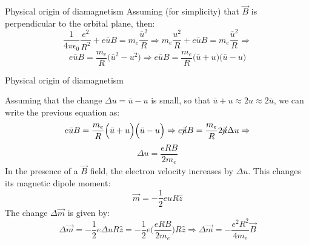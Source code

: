 \begin{frame}{Physical origin of diamagnetism}
Assuming (for simplicity) that $\vec{B}$ is perpendicular to the orbital plane, then:
\begin{equation*}
   \frac{1}{4\pi \epsilon_0} \frac{e^2}{R^2} + e \bar{u} B = m_e \frac{\bar{u}^2}{R} \Rightarrow
   m_e \frac{u^2}{R} + e \bar{u} B = m_e \frac{\bar{u}^2}{R} \Rightarrow
\end{equation*}
\begin{equation*}
    e \bar{u} B = \frac{m_e}{R} \Big( \bar{u}^2 - u^2 \Big) \Rightarrow
    e \bar{u} B = \frac{m_e}{R} \Big( \bar{u} + u \Big)  \Big( \bar{u} - u \Big)
\end{equation*}

\end{frame}


%
%
%

\begin{frame}{Physical origin of diamagnetism}

Assuming that the change ${\Delta}u = \bar{u} - u$ is small, so that $\bar{u} + u \approx 2u \approx 2\bar{u}$,
we can write the previous equation as:
\begin{equation*}
    e \bar{u} B = \frac{m_e}{R} \Big( \bar{u} + u \Big)  \Big( \bar{u} - u \Big) \Rightarrow
    e \cancel{\bar{u}} B = \frac{m_e}{R} 2 \cancel{\bar{u}} {\Delta}u \Rightarrow
\end{equation*}
\begin{equation*}
    {\Delta}u = \frac{eRB}{2m_e}
\end{equation*}
In the presence of a $\vec{B}$ field, the electron velocity increases by ${\Delta}u$.
This changes its magnetic dipole moment:
\begin{equation*}
  \vec{m} = - \frac{1}{2} e u R \hat{z}
\end{equation*}
The change $ {\Delta}\vec{m}$ is given by:
\begin{equation*}
    {\Delta}\vec{m} =
      - \frac{1}{2} e {\Delta}u R \hat{z} =
      - \frac{1}{2} e \Big( \frac{eRB}{2m_e} \Big) R \hat{z} \Rightarrow
    {\Delta}\vec{m} =
      - \frac{e^2 R^2}{4m_e} \vec{B}
\end{equation*}

\end{frame}
